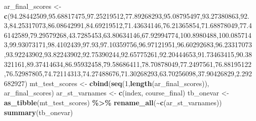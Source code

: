 \documentclass[
]{book}
\newenvironment{Shaded}{\begin{snugshade}}{\end{snugshade}}
\newcommand{\DecValTok}[1]{\textcolor[rgb]{0.00,0.00,0.81}{#1}}
\newcommand{\FloatTok}[1]{\textcolor[rgb]{0.00,0.00,0.81}{#1}}
\newcommand{\KeywordTok}[1]{\textcolor[rgb]{0.13,0.29,0.53}{\textbf{#1}}}
\newcommand{\NormalTok}[1]{#1}
\newcommand{\OperatorTok}[1]{\textcolor[rgb]{0.81,0.36,0.00}{\textbf{#1}}}
\newcommand{\StringTok}[1]{\textcolor[rgb]{0.31,0.60,0.02}{#1}}
\begin{document}
\begin{Shaded}
\begin{Highlighting}[]
\NormalTok{ar\_final\_scores \textless{}{-}}\StringTok{ }\KeywordTok{c}\NormalTok{(}\FloatTok{94.28442509}\NormalTok{,}\FloatTok{95.68817475}\NormalTok{,}\FloatTok{97.25219512}\NormalTok{,}\FloatTok{77.89268293}\NormalTok{,}\FloatTok{95.08795497}\NormalTok{,}\FloatTok{93.27380863}\NormalTok{,}\FloatTok{92.3}\NormalTok{,}\FloatTok{84.25317073}\NormalTok{,}\FloatTok{86.08642991}\NormalTok{,}\FloatTok{84.69219512}\NormalTok{,}\FloatTok{71.43634146}\NormalTok{,}\FloatTok{76.21365854}\NormalTok{,}\FloatTok{71.68878049}\NormalTok{,}\FloatTok{77.46142589}\NormalTok{,}\FloatTok{79.29579268}\NormalTok{,}\FloatTok{43.7285453}\NormalTok{,}\FloatTok{63.80634146}\NormalTok{,}\FloatTok{67.92994774}\NormalTok{,}\FloatTok{100.8980488}\NormalTok{,}\FloatTok{100.0857143}\NormalTok{,}\FloatTok{99.93073171}\NormalTok{,}\FloatTok{98.4102439}\NormalTok{,}\FloatTok{97.93}\NormalTok{,}\FloatTok{97.10359756}\NormalTok{,}\FloatTok{96.97121951}\NormalTok{,}\FloatTok{96.60292683}\NormalTok{,}\FloatTok{96.23317073}\NormalTok{,}\FloatTok{93.92243902}\NormalTok{,}\FloatTok{93.82243902}\NormalTok{,}\FloatTok{92.75390244}\NormalTok{,}\FloatTok{92.65775261}\NormalTok{,}\FloatTok{92.20444653}\NormalTok{,}\FloatTok{91.73463415}\NormalTok{,}\FloatTok{90.38321161}\NormalTok{,}\FloatTok{89.37414634}\NormalTok{,}\FloatTok{86.95932458}\NormalTok{,}\FloatTok{79.58686411}\NormalTok{,}\FloatTok{78.70878049}\NormalTok{,}\FloatTok{77.2497561}\NormalTok{,}\FloatTok{76.88195122}\NormalTok{,}\FloatTok{76.52987805}\NormalTok{,}\FloatTok{74.72114313}\NormalTok{,}\FloatTok{74.27488676}\NormalTok{,}\FloatTok{71.30268293}\NormalTok{,}\FloatTok{63.70256098}\NormalTok{,}\FloatTok{37.90426829}\NormalTok{,}\FloatTok{2.292682927}\NormalTok{)}
\NormalTok{mt\_test\_scores \textless{}{-}}\StringTok{ }\KeywordTok{cbind}\NormalTok{(}\KeywordTok{seq}\NormalTok{(}\DecValTok{1}\NormalTok{,}\KeywordTok{length}\NormalTok{(ar\_final\_scores)), ar\_final\_scores)}
\NormalTok{ar\_st\_varnames \textless{}{-}}\StringTok{ }\KeywordTok{c}\NormalTok{(}\StringTok{\textquotesingle{}index\textquotesingle{}}\NormalTok{, }\StringTok{\textquotesingle{}course\_final\textquotesingle{}}\NormalTok{)}
\NormalTok{tb\_onevar \textless{}{-}}\StringTok{ }\KeywordTok{as\_tibble}\NormalTok{(mt\_test\_scores) }\OperatorTok{\%\textgreater{}\%}\StringTok{ }\KeywordTok{rename\_all}\NormalTok{(}\OperatorTok{\textasciitilde{}}\KeywordTok{c}\NormalTok{(ar\_st\_varnames))}
\KeywordTok{summary}\NormalTok{(tb\_onevar)}
\end{Highlighting}
\end{Shaded}
\end{document}
